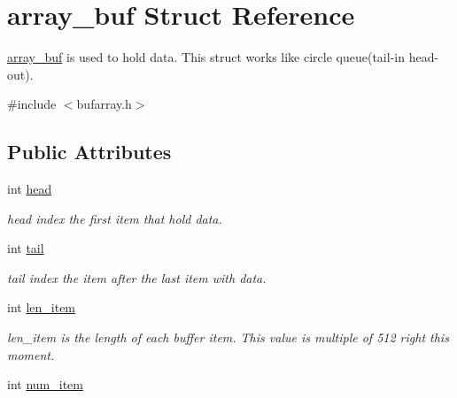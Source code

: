 \hypertarget{structarray__buf}{}\section{array\+\_\+buf Struct Reference}
\label{structarray__buf}


\hyperlink{structarray__buf}{array\+\_\+buf} is used to hold data. This struct works like circle queue(tail-\/in head-\/out).  




{\ttfamily \#include $<$bufarray.\+h$>$}

\subsection*{Public Attributes}
\begin{DoxyCompactItemize}
\item 
\hypertarget{structarray__buf_a6b3093b6347140edaaa51b676d59c205}{}int \hyperlink{structarray__buf_a6b3093b6347140edaaa51b676d59c205}{head}\label{structarray__buf_a6b3093b6347140edaaa51b676d59c205}

\begin{DoxyCompactList}\small\item\em head index the first item that hold data. \end{DoxyCompactList}\item 
\hypertarget{structarray__buf_a155c07b4ff22174031f6a05fac14f78f}{}int \hyperlink{structarray__buf_a155c07b4ff22174031f6a05fac14f78f}{tail}\label{structarray__buf_a155c07b4ff22174031f6a05fac14f78f}

\begin{DoxyCompactList}\small\item\em tail index the item after the last item with data. \end{DoxyCompactList}\item 
\hypertarget{structarray__buf_abb07ebe1e97287e5a217677e90a6e97d}{}int \hyperlink{structarray__buf_abb07ebe1e97287e5a217677e90a6e97d}{len\+\_\+item}\label{structarray__buf_abb07ebe1e97287e5a217677e90a6e97d}

\begin{DoxyCompactList}\small\item\em len\+\_\+item is the length of each buffer item. This value is multiple of 512 right this moment. \end{DoxyCompactList}\item 
\hypertarget{structarray__buf_abd212c4f472234ddb6f1cf14023a3204}{}int \hyperlink{structarray__buf_abd212c4f472234ddb6f1cf14023a3204}{num\+\_\+item}\label{structarray__buf_abd212c4f472234ddb6f1cf14023a3204}


\end{DoxyCompactItemize}
